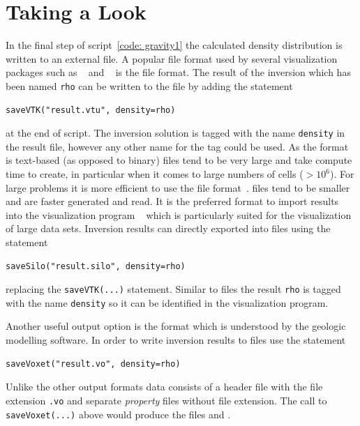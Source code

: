 \section{Taking a Look}
In the final step of script~\ref{code: gravity1} the calculated density
distribution is written to an external file.
A popular file format used by several visualization packages such as
\VisIt~\cite{VISIT} and \mayavi~\cite{mayavi} is the \VTK file format.
The result of the inversion which has been named \verb|rho| can be written to
the file  by adding the statement
\begin{verbatim}
saveVTK("result.vtu", density=rho)
\end{verbatim}
at the end of script.
The inversion solution is tagged with the name \verb|density| in the result
file, however any other name for the tag could be used.
As the format is text-based (as opposed to binary) \VTK files tend to be very
large and take compute time to create, in particular when it comes to large
numbers of cells ($>10^6$).
For large problems it is more efficient to use the \SILO file format~\cite{SILO}.
\SILO files tend to be smaller and are faster generated and read.
It is the preferred format to import results into the visualization program
\VisIt~\cite{VISIT} which is particularly suited for the visualization of
large data sets.
Inversion results can directly exported into \SILO files using the statement
\begin{verbatim}
saveSilo("result.silo", density=rho)
\end{verbatim}
replacing the \verb|saveVTK(...)| statement.
Similar to \VTK files the result \verb|rho| is tagged with the name
\verb|density| so it can be identified in the visualization program.

Another useful output option is the \Voxet format which is understood by the
\GOCAD\cite{GOCAD} geologic modelling software.
In order to write inversion results to \Voxet files use the statement
\begin{verbatim}
saveVoxet("result.vo", density=rho)
\end{verbatim}
Unlike the other output formats \Voxet data consists of a header file with the
file extension \verb|.vo| and separate \emph{property} files without file
extension. The call to \verb|saveVoxet(...)| above would produce the files
 and .

